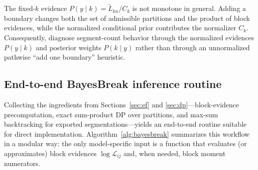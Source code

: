 \begin{remark}
\label{prop:mono-k}
The fixed-$k$ evidence $P(y\mid k)=\widetilde L_{kn}/C_k$ is not monotone in general. Adding a boundary changes both the set of admissible partitions and
the product of block evidences, while the normalized conditional prior contributes the normalizer
$C_k$. Consequently, diagnose segment-count behavior through the normalized evidences
$P(y\mid k)$ and posterior weights $P(k\mid y)$ rather than through an unnormalized pathwise
``add one boundary'' heuristic.
\end{remark}

\subsection{End-to-end BayesBreak inference routine}\label{sec:dp-alg}
Collecting the ingredients from Sections~\ref{sec:ef} and \ref{sec:dp}---block-evidence precomputation,
exact sum-product DP over partitions, and max-sum backtracking for exported segmentations---yields an
end-to-end routine suitable for direct implementation. Algorithm~\ref{alg:bayesbreak} summarizes
this workflow in a modular way: the only model-specific input is a function that evaluates (or
approximates) block evidences $\log \mathcal{L}_{ij}$ and, when needed, block moment numerators.

